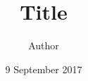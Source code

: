 \documentclass[12pt]{article}
\begin{document}
\title{Title}
\author{Author}
\date{9 September 2017}
\maketitle

\setcounter{secnumdepth}{0}
\tableofcontents
\end{document}
